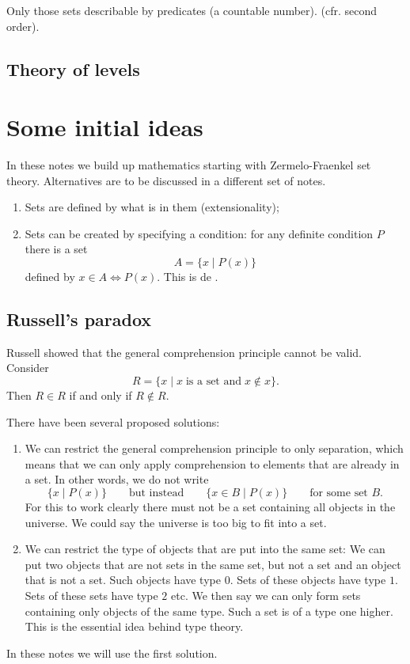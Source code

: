 Only those sets describable by predicates (a countable number). (cfr. second order).

\subsection{Theory of levels}



\section{Some initial ideas}
In these notes we build up mathematics starting with Zermelo-Fraenkel set theory. Alternatives are to be discussed in a different set of notes.
\begin{enumerate}
\item Sets are defined by what is in them (extensionality);
\item Sets can be created by specifying a condition: for any definite condition $P$ there is a set
\[ A = \{x\;|\;P(x)\} \]
defined by $x\in A \iff P(x)$. This is de .
\end{enumerate}
\subsection{Russell's paradox}
Russell showed that the general comprehension principle cannot be valid. Consider
\[ R = \{x\;|\; x\;\text{is a set and}\;x\notin x\}. \]
Then $R\in R$ if and only if $R\notin R$.

There have been several proposed solutions:
\begin{enumerate}
\item We can restrict the general comprehension principle to only separation, which means that we can only apply comprehension to elements that are already in a set. In other words, we do not write
\[ \{ x\;|\; P(x) \} \qquad \text{but instead}\qquad \{ x\in B\;|\; P(x) \}\qquad \text{for some set $B$}. \]
For this to work clearly there must not be a set containing all objects in the universe. We could say the universe is too big to fit into a set.
\item We can restrict the type of objects that are put into the same set: We can put two objects that are not sets in the same set, but not a set and an object that is not a set. Such objects have type $0$. Sets of these objects have type $1$. Sets of these sets have type $2$ etc. We then say we can only form sets containing only objects of the same type. Such a set is of a type one higher. This is the essential idea behind type theory.
\end{enumerate}
In these notes we will use the first solution.

